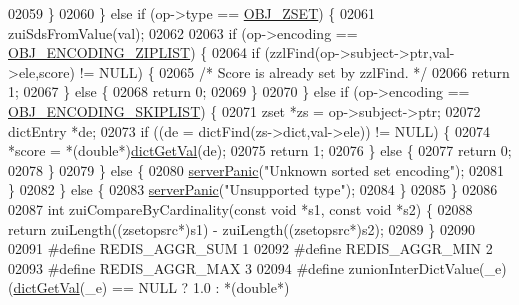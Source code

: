 \begin{DoxyCode}
02059         \}
02060     \} \textcolor{keywordflow}{else} \textcolor{keywordflow}{if} (op->type == \hyperlink{server_8h_a8c356422ddbc03bd77694880a30a1953}{OBJ\_ZSET}) \{
02061         zuiSdsFromValue(val);
02062 
02063         \textcolor{keywordflow}{if} (op->encoding == \hyperlink{server_8h_aabf064ede983103f1fd0df2086e84eee}{OBJ\_ENCODING\_ZIPLIST}) \{
02064             \textcolor{keywordflow}{if} (zzlFind(op->subject->ptr,val->ele,score) != NULL) \{
02065                 \textcolor{comment}{/* Score is already set by zzlFind. */}
02066                 \textcolor{keywordflow}{return} 1;
02067             \} \textcolor{keywordflow}{else} \{
02068                 \textcolor{keywordflow}{return} 0;
02069             \}
02070         \} \textcolor{keywordflow}{else} \textcolor{keywordflow}{if} (op->encoding == \hyperlink{server_8h_acfb35db5cb30ed113ed23aeb1a224c4c}{OBJ\_ENCODING\_SKIPLIST}) \{
02071             zset *zs = op->subject->ptr;
02072             dictEntry *de;
02073             \textcolor{keywordflow}{if} ((de = dictFind(zs->dict,val->ele)) != NULL) \{
02074                 *score = *(\textcolor{keywordtype}{double}*)\hyperlink{dict_8h_ae8d2cc391873b2bea2b87c4f80f43120}{dictGetVal}(de);
02075                 \textcolor{keywordflow}{return} 1;
02076             \} \textcolor{keywordflow}{else} \{
02077                 \textcolor{keywordflow}{return} 0;
02078             \}
02079         \} \textcolor{keywordflow}{else} \{
02080             \hyperlink{server_8h_a11cc378e7778a830b41240578de3b204}{serverPanic}(\textcolor{stringliteral}{"Unknown sorted set encoding"});
02081         \}
02082     \} \textcolor{keywordflow}{else} \{
02083         \hyperlink{server_8h_a11cc378e7778a830b41240578de3b204}{serverPanic}(\textcolor{stringliteral}{"Unsupported type"});
02084     \}
02085 \}
02086 
02087 \textcolor{keywordtype}{int} zuiCompareByCardinality(\textcolor{keyword}{const} \textcolor{keywordtype}{void} *s1, \textcolor{keyword}{const} \textcolor{keywordtype}{void} *s2) \{
02088     \textcolor{keywordflow}{return} zuiLength((zsetopsrc*)s1) - zuiLength((zsetopsrc*)s2);
02089 \}
02090 
02091 \textcolor{preprocessor}{#}\textcolor{preprocessor}{define} \textcolor{preprocessor}{REDIS\_AGGR\_SUM} 1
02092 \textcolor{preprocessor}{#}\textcolor{preprocessor}{define} \textcolor{preprocessor}{REDIS\_AGGR\_MIN} 2
02093 \textcolor{preprocessor}{#}\textcolor{preprocessor}{define} \textcolor{preprocessor}{REDIS\_AGGR\_MAX} 3
02094 \textcolor{preprocessor}{#}\textcolor{preprocessor}{define} \textcolor{preprocessor}{zunionInterDictValue}\textcolor{preprocessor}{(}\textcolor{preprocessor}{\_e}\textcolor{preprocessor}{)} \textcolor{preprocessor}{(}\hyperlink{dict_8h_ae8d2cc391873b2bea2b87c4f80f43120}{dictGetVal}\textcolor{preprocessor}{(}\textcolor{preprocessor}{\_e}\textcolor{preprocessor}{)} \textcolor{preprocessor}{==} NULL \textcolor{preprocessor}{?} 1.0 \textcolor{preprocessor}{:} \textcolor{preprocessor}{*}\textcolor{preprocessor}{(}\textcolor{keywordtype}{double}\textcolor{preprocessor}{*}\textcolor{preprocessor}{)}

\end{DoxyCode}
